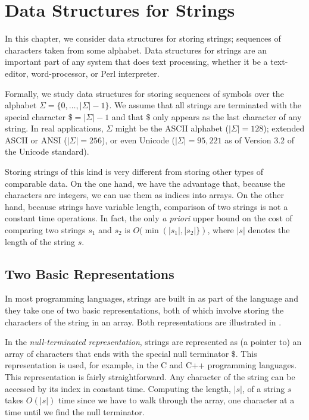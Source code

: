 \chapter{Data Structures for Strings}


In this chapter, we consider data structures for storing strings;
sequences of characters taken from some alphabet.  Data structures for
strings are an important part of any system that does text processing,
whether it be a text-editor, word-processor, or Perl interpreter.

Formally, we study data structures for storing sequences of symbols over
the alphabet $\Sigma=\{0,\ldots,|\Sigma|-1\}$.  We assume that all strings
are terminated with the special character $\$=|\Sigma|-1$ and that $\$$
only appears as the last character of any string.  In real applications,
$\Sigma$ might be the ASCII alphabet ($|\Sigma|=128$); extended ASCII or
ANSI ($|\Sigma|=256$), or even Unicode ($|\Sigma|=95,221$ as of Version
3.2 of the Unicode standard).

Storing strings of this kind is very different from storing other types
of comparable data.  On the one hand, we have the advantage that, because
the characters are integers, we can use them as indices into arrays. On
the other hand, because strings have variable length, comparison of
two strings is not a constant time operations.  In fact, the only
\emph{a priori} upper bound on the cost of comparing two strings $s_1$
and $s_2$ is $O(\min(|s_1|,|s_2|\})$, where $|s|$ denotes the length of
the string $s$.

\section{Two Basic Representations}

In most programming languages, strings are built in as part of the language
and they take one of two basic representations, both of which involve storing  the characters of the string in an array.  Both representations are illustrated in .

In the \emph{null-terminated representation}, strings are represented
as (a pointer to) an array of characters that ends with the special
null terminator $\$$.  This representation is used, for example, in the
C and C++  programming languages.  This representation is fairly straightforward.  Any character of the string can be accessed by its index in constant time.  Computing the length, $|s|$, of a string $s$ takes $O(|s|)$ time since we have to walk through the array, one character at a time until we find the null terminator.


